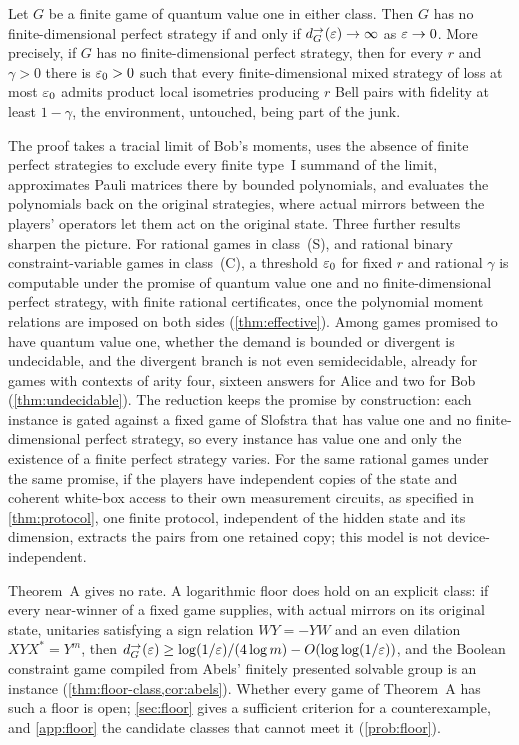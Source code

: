 \begin{theoremA}
Let $G$ be a finite game of quantum value one in either class. Then $G$ has no finite-dimensional perfect strategy if and only if
$d^\to_G(\varepsilon)\to\infty$ as $\varepsilon\to0$. More precisely, if $G$ has no finite-dimensional perfect strategy, then for every $r$
and $\gamma>0$ there is $\varepsilon_0>0$ such that every
finite-dimensional mixed strategy of loss at most $\varepsilon_0$ admits product local isometries producing $r$ Bell pairs with fidelity at
least $1-\gamma$, the environment, untouched, being part of the junk.
\end{theoremA}

The proof takes a tracial limit of Bob's moments, uses the absence of finite perfect strategies to exclude every finite type~I
summand of the limit, approximates Pauli matrices there by bounded polynomials, and evaluates the polynomials back on the original
strategies, where actual mirrors between the players' operators let them act on the original state. Three further results sharpen the
picture. For rational games in class~(S), and rational binary constraint-variable games in class~(C), a threshold $\varepsilon_0$ for
fixed $r$ and rational $\gamma$ is computable under the promise of quantum value one and no finite-dimensional perfect strategy,
with finite rational certificates, once the polynomial moment relations are imposed on both sides (\cref{thm:effective}). Among
games promised to have quantum value one, whether the demand is bounded or divergent is undecidable, and the divergent branch is
not even semidecidable, already for games with contexts of arity four, sixteen answers for Alice and two for Bob
(\cref{thm:undecidable}). The reduction keeps the promise by construction: each instance is gated against a fixed game of
Slofstra that has value one and no finite-dimensional perfect strategy, so every instance has value one and only the existence of
a finite perfect strategy varies. For the same rational games under the same promise, if the players have independent copies
of the state and coherent white-box access to their own measurement circuits, as specified in \cref{thm:protocol}, one finite
protocol, independent of the hidden state and its dimension, extracts the pairs from one retained copy; this model is not
device-independent.

Theorem~A gives no rate. A logarithmic floor does hold on an explicit class: if every near-winner of a fixed game supplies, with
actual mirrors on its original state, unitaries satisfying a sign relation $WY=-YW$ and an even dilation $XYX^*=Y^m$, then
$d^\to_G(\varepsilon)\ge\log(1/\varepsilon)/(4\log m)-O(\log\log(1/\varepsilon))$, and the Boolean constraint game compiled from Abels' finitely
presented solvable group is an instance (\cref{thm:floor-class,cor:abels}). Whether every game of Theorem~A has such a floor is
open; \cref{sec:floor} gives a sufficient criterion for a counterexample, and \cref{app:floor} the candidate classes that cannot meet
it (\cref{prob:floor}).

